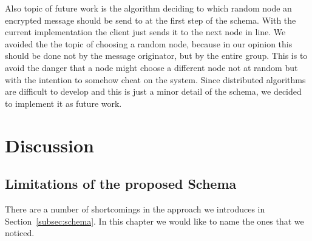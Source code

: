 \documentclass[runningheads]{llncs}
\newcommand{\comment}[1]{}
\newcommand{\refsec}[1]{Section~\ref{#1}}
\begin{document}
Also topic of future work is the algorithm deciding to which random node an encrypted message should be send to at the first step of the schema. With the current implementation the client just sends it to the next node in line. We avoided the the topic of choosing a random node, because in our opinion this should be done not by the message originator, but by the entire group. This is to avoid the danger that a node might choose a different node not at random but with the intention to somehow cheat on the system. Since distributed algorithms are difficult to develop and this is just a minor detail of the schema, we decided to implement it as future work.


\comment{
done: 
simple implementation 
simulating a simple ring with 3 clients 
2 clients are within the same circle 
smart contract has public and is able to verify messages send from the ring

Not done: 
randomization. A client will not send the message of to a new node, rather just to the next one in line

Automatic accept/reject of messages send from node to node. User has to do that at current time.

architecture: 
Clients implemented in Python 3.6

smart contract implemented using Solidity

Application was tested using the local Ethereum application Ganache

}


\section{Discussion} \label{sec:discussion}

\subsection{Limitations of the proposed Schema}

There are a number of shortcomings in the approach we introduces in \refsec{subsec:schema}. In this chapter we would like to name the ones that we noticed.
\end{document}
